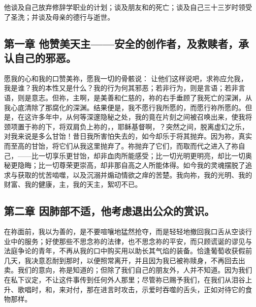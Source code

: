 他谈及自己放弃修辞学职业的计划；谈及朋友和的死亡；谈及自己三十三岁时领受了圣洗；并谈及母亲的德行与逝世。\par


\subsection{第一章 他赞美天主——安全的创作者，及救赎者，承认自己的邪恶。}

 愿我的心和我的口赞美祢，愿我一切的骨骸说： 让他们这样说吧，求祢应允我， 我是谁？我的本性又是什么？我的行为何其邪恶；若非行为，则是言语；若非言语，则是意志。但祢，主啊，是美善和仁慈的，祢的右手垂顾了我死亡的深渊，从我心底清除了那腐化的深渊。结果便是，我不愿行我所愿的，而愿行祢所愿的。但是，在这许多年中，从何等深邃隐秘之处，我的竟在片刻之间被召唤出来，使我将颈项置于祢的下，将双肩负上祢的，，耶稣基督啊，？突然之间，脱离虚幻之乐，对我来说是多么甘饴！昔日我所害怕失去的，如今却乐于将其抛弃。因为祢，真实而至高的甘饴，将它们从我这里抛弃了。祢抛弃了它们，而取而代之进入了祢自己，——比一切享乐更甘饴，却非血肉所能感受；比一切光明更明亮，却比一切奥秘更隐晦；比一切尊荣更崇高，却非那自高之人所能体得。如今我的灵魂摆脱了追求与获取的忧苦啮噬，以及沉溺并煽动情欲之痒的苦楚。我向祢，我的光明、我的财富、我的健康，主，我的天主，絮叨不已。\par


\subsection{第二章 因肺部不适，他考虑退出公众的赏识。}

在祢面前，我以为善的，是不要喧嚷地猛然抢夺，而是轻轻地撤回我口舌从空谈行业中的服务；好使那些不思念祢的法律，也不思念祢的平安，而只顾谎诞的谬见与法庭争论的青年，不再从我的口中购买用以助长其气焰的装备。恰逢葡萄收获假前几天，我决意忍耐到那时，以便照常离开，并且因为我已被祢赎身，不再回去出卖。我们的意向，祢是知道的；但除了我们自己的朋友外，人并不知道。因为我们在私下议定，不让这件事传到任何外人那里；尽管祢已赐予我们，在我们从泪谷上升、歌唱时，和，来对付，那在进言时攻击，示爱时吞噬的舌头，正如对待它的食物那样。\par

